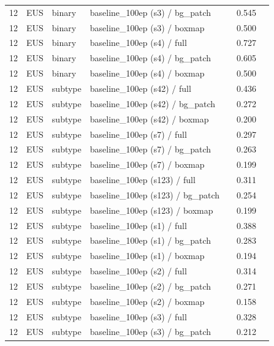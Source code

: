 \begin{longtable}{cL{1.1cm}L{1.5cm}L{5.6cm}ccc}
12 & EUS & binary & baseline\_100ep (s3) / bg\_patch & \nl{} & 0.545 & \nl{} \\
12 & EUS & binary & baseline\_100ep (s3) / boxmap & \nl{} & 0.500 & \nl{} \\
12 & EUS & binary & baseline\_100ep (s4) / full & \nl{} & 0.727 & \nl{} \\
12 & EUS & binary & baseline\_100ep (s4) / bg\_patch & \nl{} & 0.605 & \nl{} \\
12 & EUS & binary & baseline\_100ep (s4) / boxmap & \nl{} & 0.500 & \nl{} \\
12 & EUS & subtype & baseline\_100ep (s42) / full & \nl{} & 0.436 & \nl{} \\
12 & EUS & subtype & baseline\_100ep (s42) / bg\_patch & \nl{} & 0.272 & \nl{} \\
12 & EUS & subtype & baseline\_100ep (s42) / boxmap & \nl{} & 0.200 & \nl{} \\
12 & EUS & subtype & baseline\_100ep (s7) / full & \nl{} & 0.297 & \nl{} \\
12 & EUS & subtype & baseline\_100ep (s7) / bg\_patch & \nl{} & 0.263 & \nl{} \\
12 & EUS & subtype & baseline\_100ep (s7) / boxmap & \nl{} & 0.199 & \nl{} \\
12 & EUS & subtype & baseline\_100ep (s123) / full & \nl{} & 0.311 & \nl{} \\
12 & EUS & subtype & baseline\_100ep (s123) / bg\_patch & \nl{} & 0.254 & \nl{} \\
12 & EUS & subtype & baseline\_100ep (s123) / boxmap & \nl{} & 0.199 & \nl{} \\
12 & EUS & subtype & baseline\_100ep (s1) / full & \nl{} & 0.388 & \nl{} \\
12 & EUS & subtype & baseline\_100ep (s1) / bg\_patch & \nl{} & 0.283 & \nl{} \\
12 & EUS & subtype & baseline\_100ep (s1) / boxmap & \nl{} & 0.194 & \nl{} \\
12 & EUS & subtype & baseline\_100ep (s2) / full & \nl{} & 0.314 & \nl{} \\
12 & EUS & subtype & baseline\_100ep (s2) / bg\_patch & \nl{} & 0.271 & \nl{} \\
12 & EUS & subtype & baseline\_100ep (s2) / boxmap & \nl{} & 0.158 & \nl{} \\
12 & EUS & subtype & baseline\_100ep (s3) / full & \nl{} & 0.328 & \nl{} \\
12 & EUS & subtype & baseline\_100ep (s3) / bg\_patch & \nl{} & 0.212 & \nl{} \\

\end{longtable}
